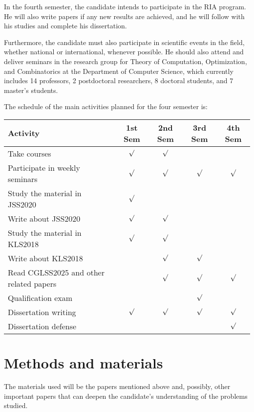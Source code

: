 \documentclass[12pt]{article}
\begin{document}
In the fourth semester, the candidate intends to participate in the RIA program.
He will also write papers if any new results are achieved, and he will follow with his studies and complete his dissertation.

Furthermore, the candidate must also participate in scientific events in the field, whether national or international, 
whenever possible. He should also attend and deliver seminars in the research group for Theory of Computation, 
Optimization, and Combinatorics at the Department of Computer Science, which currently includes 14 professors, 
2 postdoctoral researchers, 8 doctoral students, and 7 master's students.

The schedule of the main activities planned for the four semester is:

\begin{center}
{\footnotesize
\begin{tabular}{|l|c|c|c|c|}
\hline
\textbf{Activity} & \textbf{1st Sem} & \textbf{2nd Sem} & \textbf{3rd Sem} & \textbf{4th Sem} \\
\hline
Take courses                   & \(\surd\) & \(\surd\) &           &           \\
Participate in weekly seminars & \(\surd\) & \(\surd\) & \(\surd\) & \(\surd\) \\
Study the material in JSS2020  & \(\surd\) &           &           &           \\
Write about JSS2020            & \(\surd\) & \(\surd\) &           &           \\
Study the material in KLS2018  & \(\surd\) & \(\surd\) &           &           \\
Write about KLS2018            &           & \(\surd\) & \(\surd\) &           \\
Read CGLSS2025 and other related papers &  & \(\surd\) & \(\surd\) & \(\surd\) \\
Qualification exam            &            &           & \(\surd\) &           \\
Dissertation writing          & \(\surd\)  & \(\surd\) & \(\surd\) & \(\surd\) \\
Dissertation defense          &            &           &           & \(\surd\) \\
\hline
\end{tabular}
}
\end{center}


\section{Methods and materials}
The materials used will be the papers mentioned above and, possibly, other important papers that can deepen the candidate's understanding of the problems studied.
\end{document}
